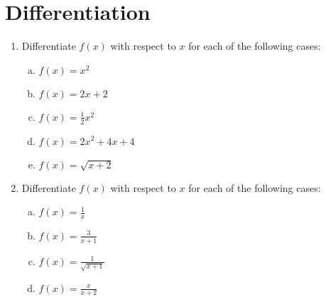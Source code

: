 \documentclass[a4paper,12pt]{article}
\begin{document}
\section*{Differentiation}

\begin{enumerate}
\item Differentiate $f(x)$ with respect to $x$ for each of the following cases:
	\begin{multicols}{2}
		\begin{enumerate}[(a)]
			\item	\qquad	 $ f(x) = x^2 \,$ %
			\item	\qquad	 $ f(x) = 2x + 2 \,$ %
			\item	\qquad	 $ f(x) = \frac{1}{2}x^2 \,$ %
			\item	\qquad	 $ f(x) = 2x^2 + 4x + 4 \,$ %

			\item	\qquad	 $ f(x) = \sqrt{x+2} \,$
								\end{enumerate}
			\end{multicols}
\item Differentiate $f(x)$ with respect to $x$ for each of the following cases:			
				\begin{multicols}{2}
		\begin{enumerate}[(a)]
		\item		 $ \displaystyle{ f(x) = \frac{1}{x} \,}$ %
			\item		 $ \displaystyle{ f(x) = \frac{3}{x+1} \,}$ %
			\item		 $ \displaystyle{ f(x) = \frac{1}{\sqrt{x+1}} \,}$ %
				\item		 $ \displaystyle{ f(x) = \frac{x}{x+2} \,}$ %
				\end{enumerate}
			\end{multicols}
			


\end{enumerate}
\end{document}
